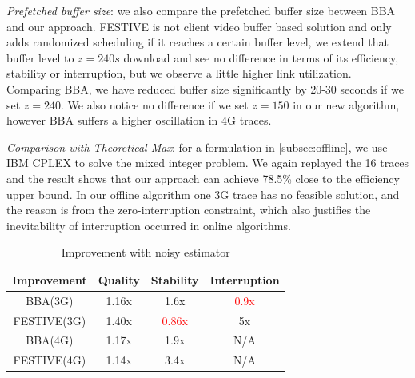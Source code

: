 
\emph{Prefetched buffer size}: we also compare the prefetched buffer size between BBA and our approach. FESTIVE is not client video buffer based solution and only adds randomized scheduling if it reaches a certain buffer level, we extend that buffer level to $z=240s$ download and see no difference in terms of its efficiency, stability or interruption, but we observe a little higher link utilization. Comparing BBA, we have reduced buffer size significantly by 20-30 seconds if we set $z=240$. We also notice no difference if we set $z=150$ in our new algorithm, however BBA suffers a higher oscillation in 4G traces. 


\emph{Comparison with Theoretical Max}: for a formulation in \autoref{subsec:offline}, we use IBM CPLEX to solve the mixed integer problem. We again replayed the 16 traces and the result shows that our approach can achieve 78.5\% close to the efficiency upper bound. In our offline algorithm one 3G trace has no feasible solution, and the reason is from the zero-interruption constraint, which also justifies the inevitability of interruption occurred in online algorithms. 



\begin{table}[t]

\begin{tabular} {|c |c |c |c |}
\hline
 Improvement &Quality &Stability & Interruption\\ \hline
BBA(3G)  & 1.16x&1.6x &\textcolor{red}{0.9x} \\ \hline
FESTIVE(3G)& 1.40x &\textcolor{red}{0.86x}& 5x\\ \hline
BBA(4G) & 1.17x& 1.9x& N/A \\ \hline
FESTIVE(4G) & 1.14x& 3.4x& N/A \\ \hline
\end{tabular}
\centering
\caption{Improvement with noisy estimator} \label{cap:table2}
\end{table}

